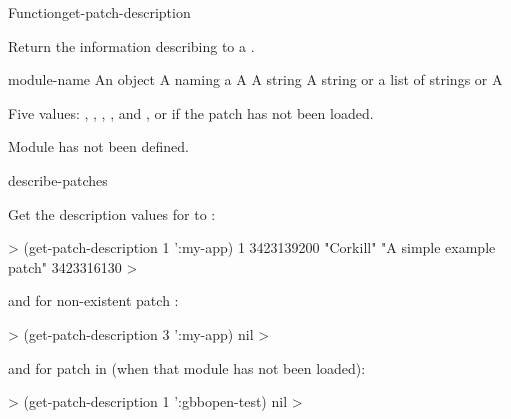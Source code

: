 \documentclass[10pt,twoside,english,pdftex]{article}
\begin{document}

\begin{functiondoc}{Function}{get-patch-description}%
  {
    \mbox{\returns{} }}
%

\fnsyntax 

\fnpurpose Return the information describing   to a
.

\fnpackage {}

\fnmodule {}

\fnargs
\begin{args}{module-name}
\arg[id] An object
 A  naming a 
\arg[date] A 
\arg[author] A string
\arg[description] A string or a list of strings or \nil
{} A 
\end{args}

\fnreturns Five values: , , , ,
and , or \nil{} if the patch has not been loaded.

\fnerrors Module  has not been defined.\\

\begin{alsos}{describe-patches}
\also[patch]
\end{alsos}

\fnexamples
%
Get the description values for   to  :
%
\W\supp
\begin{example}
  > (get-patch-description 1 ':my-app)
  1
  3423139200
  "Corkill"
  "A simple example patch"
  3423316130
  >
\end{example}
%
and for non-existent patch :
%
\W\supp\notpretop
\begin{example}
  > (get-patch-description 3 ':my-app)
  nil
  >
\end{example}
%
and for patch  in   (when that
module has not been loaded):
%
\W\supp\notpretop
\begin{example}
  > (get-patch-description 1 ':gbbopen-test)
  nil
  >
\end{example}

\end{functiondoc}
\end{document}
